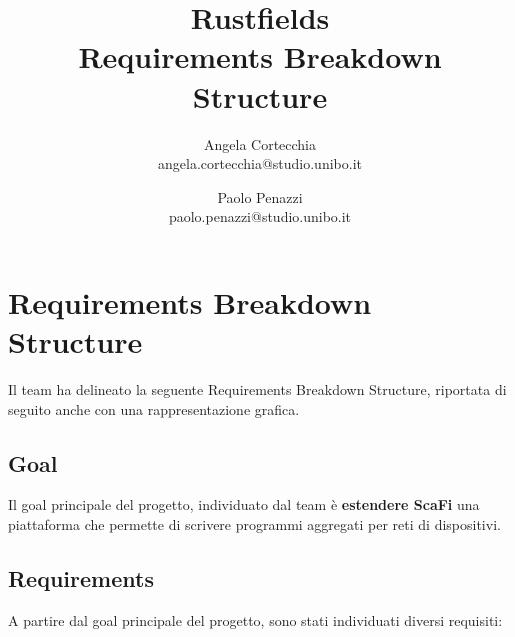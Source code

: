\documentclass[12pt, a4paper]{article}
\title{\LARGE
    Rustfields \\ 
    \small
    Requirements Breakdown Structure
    }
\author{
    Angela Cortecchia \\ 
    \small 
    angela.cortecchia@studio.unibo.it
    \and
    Paolo Penazzi \\ 
    \small
    paolo.penazzi@studio.unibo.it
}
\date{\small }
\begin{document}
\maketitle
\newpage


\section*{Requirements Breakdown Structure}

Il team ha delineato la seguente Requirements Breakdown Structure, riportata di seguito anche con una
rappresentazione grafica.

\subsection*{Goal}

Il goal principale del progetto, individuato dal team è \textbf{estendere ScaFi } una piattaforma che permette
di scrivere programmi aggregati per reti di dispositivi.

\subsection*{Requirements}

A partire dal goal principale del progetto, sono stati individuati diversi requisiti:
\end{document}
